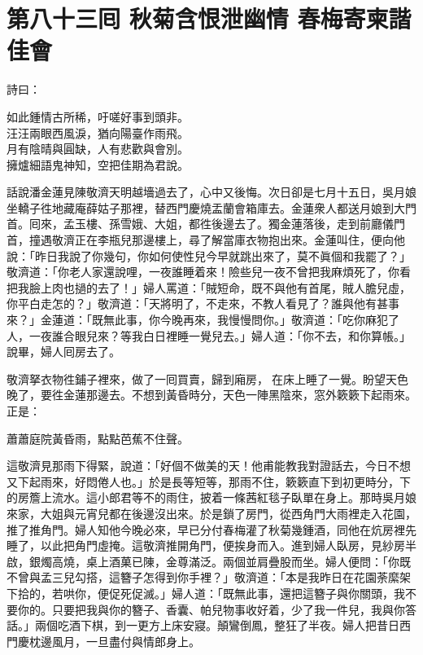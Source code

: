 
\chapter*{第八十三囘 秋菊含恨泄幽情 春梅寄柬諧佳會}


詩曰：

\begin{myquote}
如此鍾情古所稀，吁嗟好事到頭非。\\汪汪兩眼西風淚，猶向陽臺作雨飛。\\月有陰晴與圓缺，人有悲歡與會別。\\擁爐細語鬼神知，空把佳期為君說。
\end{myquote}

話說潘金蓮見陳敬濟天明越墻過去了，心中又後悔。{}次日卻是七月十五日，吳月娘坐轎子徃地藏庵薛姑子那裡，替西門慶燒盂蘭會箱庫去。金蓮衆人都送月娘到大門首。囘來，孟玉樓、孫雪娥、大姐，都徃後邊去了。獨金蓮落後，走到前廳儀門首，撞遇敬濟正在李瓶兒那邊樓上，尋了解當庫衣物抱出來。金蓮叫住，便向他說：「昨日我說了你幾句，你如何使性兒今早就跳出來了，莫不眞個和我罷了？」敬濟道：「你老人家還說哩，一夜誰睡着來！險些兒一夜不曾把我麻煩死了，你看把我臉上肉也撾的去了！」婦人罵道：「賊短命，既不與他有首尾，賊人膽兒虛，你平白走怎的？」{}敬濟道：「天將明了，不走來，不教人看見了？誰與他有甚事來？」金蓮道：「既無此事，你今晚再來，我慢慢問你。」敬濟道：「吃你麻犯了人，一夜誰合眼兒來？等我白日裡睡一覺兒去。」婦人道：「你不去，和你算帳。」{}說畢，婦人囘房去了。

敬濟拏衣物徃鋪子裡來，做了一囘買賣，歸到廂房，𢱉在床上睡了一覺。盼望天色晚了，要徃金蓮那邊去。不想到黃昏時分，天色一陣黑陰來，窓外簌簌下起雨來。{}正是：

\begin{myquote}
蕭蕭庭院黃昏雨，點點芭蕉不住聲。
\end{myquote}

這敬濟見那雨下得緊，說道：「好個不做美的天！他甫能教我對證話去，今日不想又下起雨來，好悶倦人也。」於是長等短等，那雨不住，簌簌直下到初更時分，下的房簷上流水。這小郎君等不的雨住，披着一條茜紅毯子臥單在身上。{}那時吳月娘來家，大姐與元宵兒都在後邊沒出來。於是鎖了房門，從西角門大雨裡走入花園，推了推角門。婦人知他今晚必來，早已分付春梅灌了秋菊幾鍾酒，同他在炕房裡先睡了，以此把角門虛掩。這敬濟推開角門，便挨身而入。進到婦人臥房，見紗房半啟，銀燭高燒，桌上酒菓已陳，金尊滿泛。兩個並肩疊股而坐。婦人便問：「你既不曾與孟三兒勾搭，這簪子怎得到你手裡？」敬濟道：「本是我昨日在花園荼縻架下拾的，若哄你，便促死促滅。」婦人道：「既無此事，還把這簪子與你關頭，{}我不要你的。只要把我與你的簪子、香囊、帕兒物事收好着，少了我一件兒，我與你答話。」兩個吃酒下棋，到一更方上床安寢。顛鸞倒鳳，整狂了半夜。婦人把昔日西門慶枕邊風月，一旦盡付與情郎身上。

